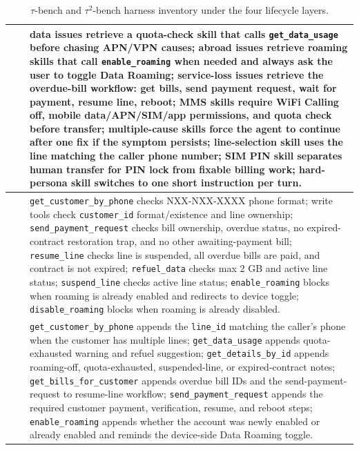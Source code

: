 \begin{table}[t]
\begin{tabular}{>{\centering\arraybackslash}m{}>{\centering\arraybackslash}m{}p{}}
\cmidrule(lr){2-3}
& \multirow{7}{*}{Procedural Skill Layer}
& data issues retrieve a quota-check skill that calls \texttt{get\_data\_usage} before
chasing APN/VPN causes; abroad issues retrieve roaming skills that call
\texttt{enable\_roaming} when needed and always ask the user to toggle Data Roaming;
service-loss issues retrieve the overdue-bill workflow: get bills, send payment
request, wait for payment, resume line, reboot; MMS skills require WiFi Calling
off, mobile data/APN/SIM/app permissions, and quota check before transfer;
multiple-cause skills force the agent to continue after one fix if the symptom
persists; line-selection skill uses the line matching the caller phone number;
SIM PIN skill separates human transfer for PIN lock from fixable billing work;
hard-persona skill switches to one short instruction per turn. \\
\cmidrule(lr){2-3}
& \multirow{6}{*}{Action Realization Layer}
& \texttt{get\_customer\_by\_phone} checks NXX-NXX-XXXX phone format; write tools check
\texttt{customer\_id} format/existence and line ownership; \texttt{send\_payment\_request} checks
bill ownership, overdue status, no expired-contract restoration trap, and no
other awaiting-payment bill; \texttt{resume\_line} checks line is suspended, all overdue
bills are paid, and contract is not expired; \texttt{refuel\_data} checks max 2 GB and
active line status; \texttt{suspend\_line} checks active line status; \texttt{enable\_roaming}
blocks when roaming is already enabled and redirects to device toggle;
\texttt{disable\_roaming} blocks when roaming is already disabled. \\
\cmidrule(lr){2-3}
& \multirow{6}{*}{Trajectory Regulation Layer}
& \texttt{get\_customer\_by\_phone} appends the \texttt{line\_id} matching the caller's phone when the
customer has multiple lines; \texttt{get\_data\_usage} appends quota-exhausted warning and
refuel suggestion; \texttt{get\_details\_by\_id} appends roaming-off, quota-exhausted,
suspended-line, or expired-contract notes; \texttt{get\_bills\_for\_customer} appends overdue
bill IDs and the send-payment-request to resume-line workflow; \texttt{send\_payment\_request}
appends the required customer payment, verification, resume, and reboot steps;
\texttt{enable\_roaming} appends whether the account was newly enabled or already enabled
and reminds the device-side Data Roaming toggle. \\
\bottomrule
\end{tabular}
\caption{$\tau$-bench and $\tau^2$-bench harness inventory under the four lifecycle layers.}
\label{tab:taubench-inventory}
\end{table}

